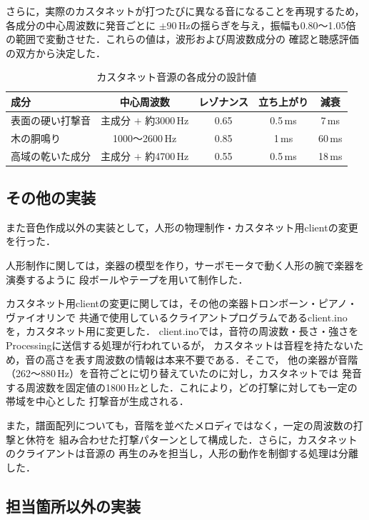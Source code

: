 さらに，実際のカスタネットが打つたびに異なる音になることを再現するため，各成分の中心周波数に発音ごとに
$\pm90$\,Hzの揺らぎを与え，振幅も0.80〜1.05倍の範囲で変動させた．これらの値は，波形および周波数成分の
確認と聴感評価の双方から決定した．

\begin{table}[H]
  \centering
  \caption{カスタネット音源の各成分の設計値}
  \label{tab:castanet_params}
  \begin{tabular}{lcccc}
    \hline
    成分 & 中心周波数 & レゾナンス & 立ち上がり & 減衰 \\
    \hline
    表面の硬い打撃音 & 主成分 $+$ 約3000\,Hz & 0.65 & 0.5\,ms & 7\,ms \\
    木の胴鳴り & 1000〜2600\,Hz & 0.85 & 1\,ms & 60\,ms \\
    高域の乾いた成分 & 主成分 $+$ 約4700\,Hz & 0.55 & 0.5\,ms & 18\,ms \\
    \hline
  \end{tabular}
\end{table}

\subsection{その他の実装}
また音色作成以外の実装として，人形の物理制作・カスタネット用clientの変更を行った．

人形制作に関しては，楽器の模型を作り，サーボモータで動く人形の腕で楽器を演奏するように
段ボールやテープを用いて制作した．

カスタネット用clientの変更に関しては，その他の楽器トロンボーン・ピアノ・ヴァイオリンで
共通で使用しているクライアントプログラムであるclient.inoを，カスタネット用に変更した．
client.inoでは，音符の周波数・長さ・強さをProcessingに送信する処理が行われているが，
カスタネットは音程を持たないため，音の高さを表す周波数の情報は本来不要である．そこで，
他の楽器が音階（262〜880\,Hz）を音符ごとに切り替えていたのに対し，カスタネットでは
発音する周波数を固定値の1800\,Hzとした．これにより，どの打撃に対しても一定の帯域を中心とした
打撃音が生成される．

また，譜面配列についても，音階を並べたメロディではなく，一定の周波数の打撃と休符を
組み合わせた打撃パターンとして構成した．さらに，カスタネットのクライアントは音源の
再生のみを担当し，人形の動作を制御する処理は分離した．

\subsection{担当箇所以外の実装}
